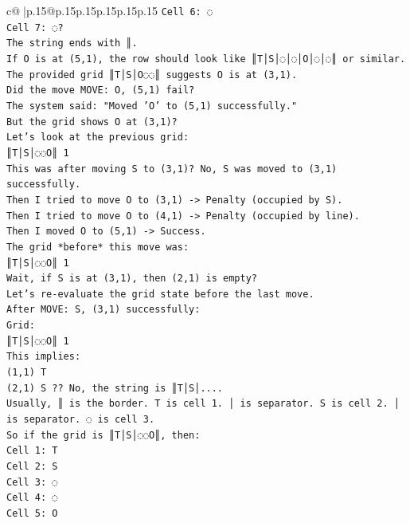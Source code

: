 \documentclass{article}
\begin{document}
{\begin{supertabular}{c@{$\;$}|p{.15\linewidth}@{}p{.15\linewidth}p{.15\linewidth}p{.15\linewidth}p{.15\linewidth}p{.15\linewidth}}
{{{\texttt{Cell 6: ◌} \\
\texttt{Cell 7: ◌?} \\
\texttt{The string ends with ║.} \\
\texttt{If O is at (5,1), the row should look like ║T│S│◌│◌│O│◌│◌║ or similar.} \\
\texttt{The provided grid ║T│S│O◌◌║ suggests O is at (3,1).} \\
\texttt{Did the move MOVE: O, (5,1) fail?} \\
\texttt{The system said: "Moved 'O' to (5,1) successfully."} \\
\texttt{But the grid shows O at (3,1)?} \\
\texttt{Let's look at the previous grid:} \\
\texttt{║T│S│◌◌O║ 1} \\
\texttt{This was after moving S to (3,1)? No, S was moved to (3,1) successfully.} \\
\texttt{Then I tried to move O to (3,1) {-}> Penalty (occupied by S).} \\
\texttt{Then I tried to move O to (4,1) {-}> Penalty (occupied by line).} \\
\texttt{Then I moved O to (5,1) {-}> Success.} \\
\texttt{The grid *before* this move was:} \\
\texttt{║T│S│◌◌O║ 1} \\
\texttt{Wait, if S is at (3,1), then (2,1) is empty?} \\
\texttt{Let's re{-}evaluate the grid state before the last move.} \\
\texttt{After MOVE: S, (3,1) successfully:} \\
\texttt{Grid:} \\
\texttt{║T│S│◌◌O║ 1} \\
\texttt{This implies:} \\
\texttt{(1,1) T} \\
\texttt{(2,1) S ?? No, the string is ║T│S│....} \\
\texttt{Usually, ║ is the border. T is cell 1. │ is separator. S is cell 2. │ is separator. ◌ is cell 3.} \\
\texttt{So if the grid is ║T│S│◌◌O║, then:} \\
\texttt{Cell 1: T} \\
\texttt{Cell 2: S} \\
\texttt{Cell 3: ◌} \\
\texttt{Cell 4: ◌} \\
\texttt{Cell 5: O} \\
}}}
\end{supertabular}}
\end{document}
